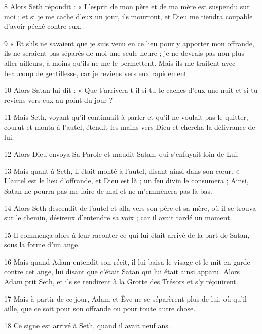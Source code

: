 \par 8 Alors Seth répondit : « L'esprit de mon père et de ma mère est suspendu sur moi ; et si je me cache d'eux un jour, ils mourront, et Dieu me tiendra coupable d'avoir péché contre eux.

\par 9 « Et s'ils ne savaient que je suis venu en ce lieu pour y apporter mon offrande, ils ne seraient pas séparés de moi une seule heure ; je ne devrais pas non plus aller ailleurs, à moins qu’ils ne me le permettent. Mais ils me traitent avec beaucoup de gentillesse, car je reviens vers eux rapidement.

\par 10 Alors Satan lui dit : « Que t'arrivera-t-il si tu te caches d'eux une nuit et si tu reviens vers eux au point du jour ?

\par 11 Mais Seth, voyant qu'il continuait à parler et qu'il ne voulait pas le quitter, courut et monta à l'autel, étendit les mains vers Dieu et chercha la délivrance de lui.

\par 12 Alors Dieu envoya Sa Parole et maudit Satan, qui s'enfuyait loin de Lui.

\par 13 Mais quant à Seth, il était monté à l'autel, disant ainsi dans son cœur. « L'autel est le lieu d'offrande, et Dieu est là ; un feu divin le consumera ; Ainsi, Satan ne pourra pas me faire de mal et ne m’emmènera pas là-bas.

\par 14 Alors Seth descendit de l'autel et alla vers son père et sa mère, où il se trouva sur le chemin, désireux d'entendre sa voix ; car il avait tardé un moment.

\par 15 Il commença alors à leur raconter ce qui lui était arrivé de la part de Satan, sous la forme d'un ange.

\par 16 Mais quand Adam entendit son récit, il lui baisa le visage et le mit en garde contre cet ange, lui disant que c'était Satan qui lui était ainsi apparu. Alors Adam prit Seth, et ils se rendirent à la Grotte des Trésors et s'y réjouirent.

\par 17 Mais à partir de ce jour, Adam et Ève ne se séparèrent plus de lui, où qu'il aille, que ce soit pour son offrande ou pour toute autre chose.

\par 18 Ce signe est arrivé à Seth, quand il avait neuf ans.


